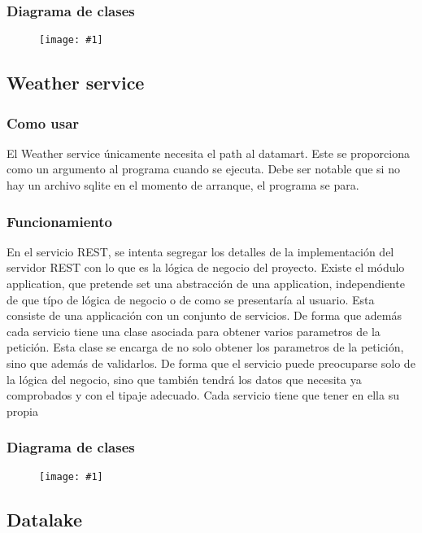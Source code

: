 \documentclass{article}
\newcommand{\cimg}[2]{
\begin{figure}[H]
	\center
		\texttt{[image: \#1]}
\end{figure}
}
\begin{document}
\subsubsection{Diagrama de clases}

\cimg{datamart}{1}

\subsection{Weather service}

\subsubsection{Como usar}

El Weather service únicamente necesita el path al datamart. Este se proporciona como un argumento al programa cuando se ejecuta.
Debe ser notable que si no hay un archivo sqlite en el momento de arranque, el programa se para.

\subsubsection{Funcionamiento}

En el servicio REST, se intenta segregar los detalles de la implementación del servidor REST con lo que es la lógica de negocio del proyecto.
Existe el módulo application, que pretende set una abstracción de una application, independiente de que típo de lógica de negocio o de como se presentaría al usuario.
Esta consiste de una applicación con un conjunto de servicios. De forma que además cada servicio tiene una clase asociada para obtener varios parametros de la petición.
Esta clase se encarga de no solo obtener los parametros de la petición, sino que además de validarlos. De forma que el servicio puede preocuparse solo de la lógica del negocio,
sino que también tendrá los datos que necesita ya comprobados y con el tipaje adecuado. Cada servicio tiene que tener en ella su propia 

\subsubsection{Diagrama de clases}

\cimg{service}{1}

\newpage

\subsection{Datalake}
\end{document}
